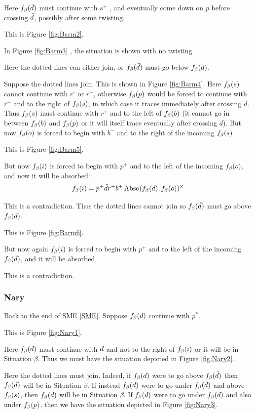 Here $f_\beta(\bar{d})$ must continue with $s^+$ , and eventually come down on $p$ before crossing $\bar{d}$, possibly after some twisting.

This is Figure \ref{fig:Barm2}.

In Figure \ref{fig:Barm3} , the situation is shown with no twisting.

Here the dotted lines can either join, or $f_\beta(\bar{d})$ must go below $f_\beta(d)$.

Suppose the dotted lines join. This is shown in Figure \ref{fig:Barm4}. Here $f_\beta(s)$ cannot continue with $r^\circ$ or $r^-$, otherwise $f_\beta(p)$ would be forced to continue with $r^-$ and to the right of $f_\beta(s)$, in which case it traces immediately after crossing $d$. Thus $f_\beta(s)$ must continue with $r^+$ and to the left of $f_\beta(b)$ (it cannot go in between $f_\beta(b)$ and $f_\beta(p)$ or it will itself trace eventually after crossing $d$). But now $f_\beta(o)$ is forced to begin with $b^-$ and to the right of the incoming $f_\beta(s)$.

This is Figure \ref{fig:Barm5}.

But now $f_\beta(i)$ is forced to begin with $p^+$ and to the left of the incoming $f_\beta(o)$, and now it will be absorbed:
\[
f_\beta(i) = p^+ \bar{d} r^+ b^+ \operatorname{Abso}(f_\beta(d), f_\beta(o))^\times
\]

This is a contradiction. Thus the dotted lines cannot join so $f_\beta(\bar{d})$ must go above $f_\beta(d)$. 

This is Figure \ref{fig:Barm6}.

But now again $f_\beta(i)$ is forced to begin with $p^+$ and to the left of the incoming $f_\beta(\bar{d})$, and it will be absorbed.

This is a contradiction.

\subsubsection{Nary}\label{Nary}
Back to the end of SME \ref{SME}. Suppose $f_\beta(\bar{d})$ continue with $p^*$.

This is Figure \ref{fig:Nary1}.

Here $f_\beta(\bar{d})$ must continue with $\bar{d}$ and not to the right of $f_\beta(i)$ or it will be in Situation $\beta$. Thus we must have the situation depicted in Figure \ref{fig:Nary2}.

Here the dotted lines must join. Indeed, if $f_\beta(d)$ were to go above $f_\beta(\bar{d})$ then $f_\beta(\bar{d})$ will be in Situation $\beta$. If instead $f_\beta(d)$ were to go under $f_\beta(\bar{d})$ and above $f_\beta(s)$, then $f_\beta(d)$ will be in Situation $\beta$. If $f_\beta(d)$ were to go under $f_\beta(\bar{d})$ and also under $f_\beta(p)$, then we have the situation depicted in Figure \ref{fig:Nary3}.

